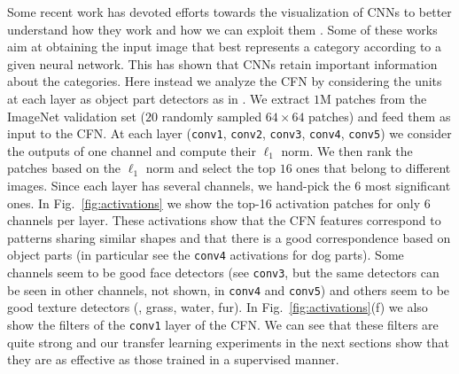 \documentclass[runningheads]{llncs}
\begin{document}
Some recent work has devoted efforts towards the visualization of CNNs to better understand how they work and how we can exploit them \cite{ZeilerF2014,simonyanVZ14,mahendranV15,YosinskiCNFL2015}. Some of these works %
aim at obtaining the input image that best represents a category according to a given neural network. This has shown that CNNs retain important information about the categories. Here instead we analyze the CFN by considering the units at each layer as object part detectors as in \cite{GirshickDDM2014}. We extract $1$M patches from the ImageNet validation set ($20$ randomly sampled $64\times 64$ patches) and feed them as input to the CFN. At each layer (\texttt{conv1}, \texttt{conv2}, \texttt{conv3}, \texttt{conv4}, \texttt{conv5}) we consider the outputs of one channel and compute their $\ell_1$ norm. We then rank the patches based on the $\ell_1$ norm and select the top $16$ ones that belong to different images. Since each layer has several channels, we hand-pick the $6$ most significant ones. In Fig.~\ref{fig:activations} we show the top-16 activation patches for only $6$ channels per layer. These activations show that the CFN features correspond to patterns sharing similar shapes and that there is a good correspondence based on object parts (in particular see the \texttt{conv4} activations for dog parts). Some channels seem to be good face detectors (see \texttt{conv3}, but the same detectors can be seen in other channels, not shown, in \texttt{conv4} and \texttt{conv5}) and others seem to be good texture detectors (\eg, grass, water, fur). In Fig.~\ref{fig:activations}(f) we also show the filters of the \texttt{conv1} layer of the CFN. We can see that these filters are quite strong and our transfer learning experiments in the next sections show that they are as effective as those trained in a supervised manner.
\end{document}
